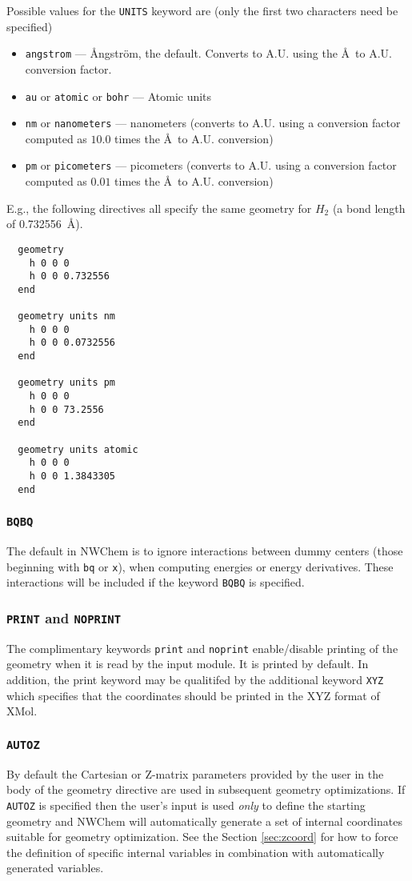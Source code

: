 Possible values for the \verb+UNITS+ keyword are (only the first two
characters need be specified)
\begin{itemize}
  \item \verb+angstrom+ --- {\AA}ngstr\"{o}m, the default.  Converts
   to A.U. using the \AA\ to A.U. conversion factor.
  \item \verb+au+ or \verb+atomic+ or \verb+bohr+ --- Atomic units
  \item \verb+nm+ or \verb+nanometers+ --- nanometers (converts to
     A.U. using a conversion factor computed as $10.0$ times the
     \AA\ to A.U. conversion) 
  \item \verb+pm+ or \verb+picometers+ --- picometers (converts to 
    A.U. using a conversion factor computed as $0.01$ times the 
     \AA\ to A.U. conversion)
\end{itemize}

E.g., the following directives all specify the same geometry for $H_2$
(a bond length of 0.732556\ \AA).
\begin{verbatim}
  geometry
    h 0 0 0
    h 0 0 0.732556
  end

  geometry units nm
    h 0 0 0
    h 0 0 0.0732556
  end

  geometry units pm
    h 0 0 0
    h 0 0 73.2556
  end

  geometry units atomic
    h 0 0 0
    h 0 0 1.3843305
  end
\end{verbatim}
      
\subsubsection*{{\tt BQBQ}}
The default in NWChem is to ignore interactions between dummy centers
(those beginning with \verb+bq+ or \verb+x+),
when computing energies or energy derivatives.  These interactions
will be included if the keyword \verb+BQBQ+ is specified.

\subsubsection*{{\tt PRINT} and {\tt NOPRINT}}
The complimentary keywords \verb+print+ and \verb+noprint+
enable/disable printing of the geometry when it is read by the input
module.  It is printed by default.  In addition, the print keyword may
be qualitifed by the additional keyword \verb+XYZ+ which specifies
that the coordinates should be printed in the XYZ format of XMol.

\subsubsection*{{\tt AUTOZ}}
By default the Cartesian or Z-matrix parameters provided by the user
in the body of the geometry directive are used in subsequent geometry
optimizations.  If \verb+AUTOZ+ is specified then the user's input is
used {\em only} to define the starting geometry and NWChem will
automatically generate a set of internal coordinates suitable for
geometry optimization.  See the Section \ref{sec:zcoord} for how to
force the definition of specific internal variables in combination
with automatically generated variables.

